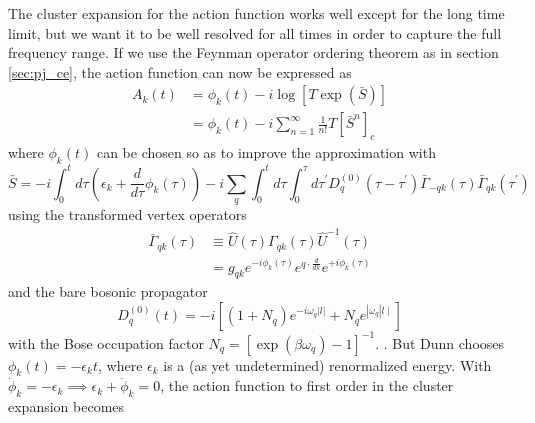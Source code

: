 The cluster expansion for the action function works well except for the long time limit, but we want it to be well resolved for all times in order to capture the full frequency range. If we use the Feynman operator ordering theorem as in section \ref{sec:pj_ce}, the action function can now be expressed as
\begin{align}
    A_k(t) &= \phi_k(t) - i \log [T \exp (\bar{S})] \\
&= \phi_k(t) - i \sum_{n=1}^{\infty} \frac{1}{n!} T\left[\bar{S}^n\right]_c
\end{align}
where $\phi_k(t)$ can be chosen so as to improve the approximation with 
\begin{equation}
    \bar{S} = -i \int_0^t d \tau\left(\epsilon_k+\frac{d}{d \tau} \phi_k(\tau)\right) -i \sum_q \int_0^t d \tau \int_0^\tau d \tau^{\prime} D_q^{(0)}\left(\tau-\tau^{\prime}\right) \bar{\Gamma}_{-q k}(\tau) \bar{\Gamma}_{q k}\left(\tau^{\prime}\right)
\end{equation}
 using the transformed vertex operators
\begin{align}
    \bar{\Gamma}_{q k}(\tau)&\equiv  \hat{U}(\tau)\Gamma_{q k}(\tau)\hat{U}^{-1}(\tau)\\
&=g_{q k} e^{-i \phi_k(\tau)} e^{q \cdot \frac{d}{d k}} e^{+i \phi_k(\tau)}
\end{align}
and the bare bosonic propagator 
\begin{equation}
    D_q^{(0)}(t)= -i\left[\left(1+N_q\right) e^{-i \omega_q|l|}+N_q e^{\left|\omega_q\right| l \mid}\right]
\end{equation}
with the Bose occupation factor $N_q=\left[\exp \left(\beta \omega_q\right)-1\right]^{-1}$. . But Dunn chooses $\phi_k(t)= -\epsilon_k t$, where $\epsilon_k$ is a (as yet undetermined) renormalized energy. With $\dot{\phi}_k = -\epsilon_k \implies  \epsilon_k + \dot{\phi}_k = 0$, the action function to first order in the cluster expansion becomes
